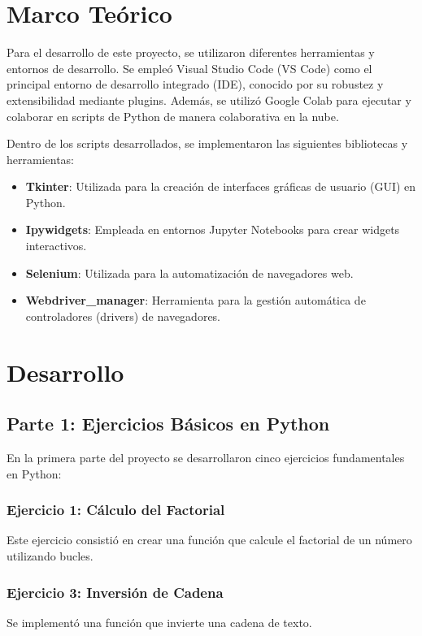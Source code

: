 \documentclass[twocolumn]{article}
\begin{document}
\section*{Marco Teórico}
Para el desarrollo de este proyecto, se utilizaron diferentes herramientas y entornos de desarrollo. Se empleó Visual Studio Code (VS Code) como el principal entorno de desarrollo integrado (IDE), conocido por su robustez y extensibilidad mediante plugins. Además, se utilizó Google Colab para ejecutar y colaborar en scripts de Python de manera colaborativa en la nube.

Dentro de los scripts desarrollados, se implementaron las siguientes bibliotecas y herramientas:
\begin{itemize}
    \item \textbf{Tkinter}: Utilizada para la creación de interfaces gráficas de usuario (GUI) en Python.
    \item \textbf{Ipywidgets}: Empleada en entornos Jupyter Notebooks para crear widgets interactivos.
    \item \textbf{Selenium}: Utilizada para la automatización de navegadores web.
    \item \textbf{Webdriver\_manager}: Herramienta para la gestión automática de controladores (drivers) de navegadores.
\end{itemize}

\section*{Desarrollo}

\subsection*{Parte 1: Ejercicios Básicos en Python}
En la primera parte del proyecto se desarrollaron cinco ejercicios fundamentales en Python:

\subsubsection*{Ejercicio 1: Cálculo del Factorial}
Este ejercicio consistió en crear una función que calcule el factorial de un número utilizando bucles.

\subsubsection*{Ejercicio 3: Inversión de Cadena}
Se implementó una función que invierte una cadena de texto.
\end{document}
